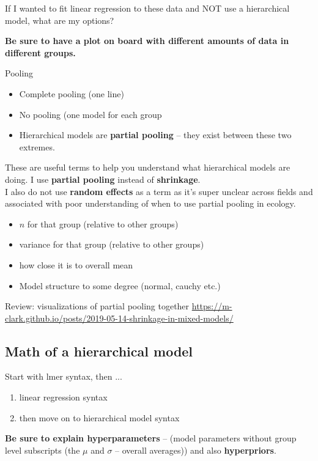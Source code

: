 \documentclass[11pt]{article}
\begin{document}
If I wanted to fit  linear regression to these data and NOT use a hierarchical model, what are my options?

{\bf Be sure to have a plot on board with different amounts of data in different groups.}

{\Large Pooling} %
\begin{itemize}
\item Complete pooling (one line)
\item No pooling (one model for each group
\item Hierarchical models are {\bf partial pooling} -- they exist between these two extremes. 
\end{itemize}

These are useful terms to help you understand what hierarchical models are doing. I use {\bf partial pooling} instead of {\bf shrinkage}. \\
I also do not use {\bf random effects} as a term as it's super unclear across fields and associated with poor understanding of when to use partial pooling in ecology.


\begin{itemize}
\item $n$ for that group (relative to other groups)
\item variance for that group (relative to other groups)
\item how close it is to overall mean 
\item Model structure to some degree (normal, cauchy etc.)
\end{itemize}

Review: visualizations of partial pooling together \url{https://m-clark.github.io/posts/2019-05-14-shrinkage-in-mixed-models/}

\subsection{Math of a hierarchical model}

Start with lmer syntax, then ...
\begin{enumerate}
\item linear regression syntax
\item then move on to hierarchical model syntax
\end{enumerate}

{\bf Be sure to explain hyperparameters} -- (model parameters without group level subscripts (the $\mu$ and $\sigma$ -- overall averages)) and also {\bf hyperpriors}.
\end{document}
